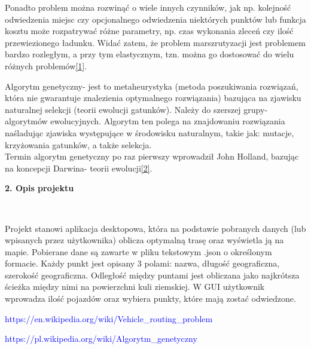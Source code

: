 \documentclass[12pt]{article}
\begin{document}
	\vspace{5mm} %

	\hspace{5mm}Ponadto problem można rozwinąć o wiele innych czynników, jak np. kolejność odwiedzenia miejsc czy opcjonalnego odwiedzenia niektórych punktów lub funkcja kosztu może rozpatrywać różne parametry, np. czas wykonania zleceń czy ilość przewiezionego ładunku. Widać zatem, że problem marszrutyzacji jest problemem bardzo rozległym, a przy tym elastycznym, tzn. można go dostosować do wielu różnych problemów\hyperlink{vrp}{[1]}. 
	
	\vspace{5mm} %
	
	\hspace{5mm}Algorytm genetyczny- jest to metaheurystyka (metoda poszukiwania rozwiązań, która nie gwarantuje znalezienia optymalnego rozwiązania) bazująca na zjawisku naturalnej selekcji (teorii ewolucji gatunków). Należy do szerszej grupy- algorytmów ewolucyjnych. Algorytm ten polega na znajdowaniu rozwiązania naśladując zjawiska występujące w środowisku naturalnym, takie jak: mutacje, krzyżowania gatunków, a także selekcja. \\
	Termin algorytm genetyczny po raz pierwszy wprowadził John Holland, bazując na koncepcji Darwina- teorii ewolucji\hyperlink{ag}{[2]}.
	
	\newpage
	\begin{large}\textbf{2. Opis projektu}\end{large}\\
	\vspace{10mm} %
	
	\hspace{5mm}Projekt stanowi aplikacja desktopowa, która na podstawie pobranych danych (lub wpisanych przez użytkownika) oblicza optymalną trasę oraz wyświetla ją na mapie. Pobierane dane są zawarte w pliku tekstowym .json o określonym formacie. Każdy punkt jest opisany 3 polami: nazwa, długość geograficzna, szerokość geograficzna. Odległość między puntami jest obliczana jako najkrótsza ścieżka między nimi na powierzchni kuli ziemskiej. W GUI użytkownik wprowadza ilość pojazdów oraz wybiera punkty, które mają zostać odwiedzone.
	
	
	
	\newpage
	\renewcommand\refname{Źródła}
	\begin{thebibliography}{}
		{\hypertarget{vrp}{\textcolor{blue}{https://en.wikipedia.org/wiki/Vehicle\_routing\_problem}}}
		
		{\hypertarget{ag}{\textcolor{blue}{https://pl.wikipedia.org/wiki/Algorytm\_genetyczny}}}
		
	\end{thebibliography}
	
	
	
\end{document}
